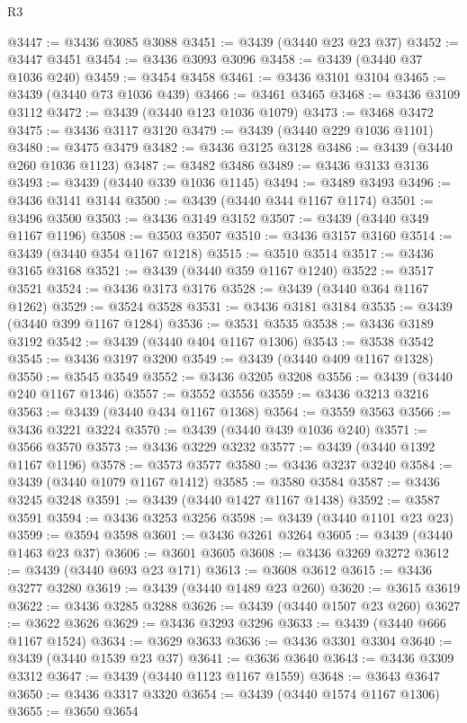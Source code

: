 \begin{lexlean}{R3}
\begin{coremodule}
@3447 := @3436 @3085 @3088
@3451 := @3439 (@3440 @23 @23 @37)
@3452 := @3447 @3451
@3454 := @3436 @3093 @3096
@3458 := @3439 (@3440 @37 @1036 @240)
@3459 := @3454 @3458
@3461 := @3436 @3101 @3104
@3465 := @3439 (@3440 @73 @1036 @439)
@3466 := @3461 @3465
@3468 := @3436 @3109 @3112
@3472 := @3439 (@3440 @123 @1036 @1079)
@3473 := @3468 @3472
@3475 := @3436 @3117 @3120
@3479 := @3439 (@3440 @229 @1036 @1101)
@3480 := @3475 @3479
@3482 := @3436 @3125 @3128
@3486 := @3439 (@3440 @260 @1036 @1123)
@3487 := @3482 @3486
@3489 := @3436 @3133 @3136
@3493 := @3439 (@3440 @339 @1036 @1145)
@3494 := @3489 @3493
@3496 := @3436 @3141 @3144
@3500 := @3439 (@3440 @344 @1167 @1174)
@3501 := @3496 @3500
@3503 := @3436 @3149 @3152
@3507 := @3439 (@3440 @349 @1167 @1196)
@3508 := @3503 @3507
@3510 := @3436 @3157 @3160
@3514 := @3439 (@3440 @354 @1167 @1218)
@3515 := @3510 @3514
@3517 := @3436 @3165 @3168
@3521 := @3439 (@3440 @359 @1167 @1240)
@3522 := @3517 @3521
@3524 := @3436 @3173 @3176
@3528 := @3439 (@3440 @364 @1167 @1262)
@3529 := @3524 @3528
@3531 := @3436 @3181 @3184
@3535 := @3439 (@3440 @399 @1167 @1284)
@3536 := @3531 @3535
@3538 := @3436 @3189 @3192
@3542 := @3439 (@3440 @404 @1167 @1306)
@3543 := @3538 @3542
@3545 := @3436 @3197 @3200
@3549 := @3439 (@3440 @409 @1167 @1328)
@3550 := @3545 @3549
@3552 := @3436 @3205 @3208
@3556 := @3439 (@3440 @240 @1167 @1346)
@3557 := @3552 @3556
@3559 := @3436 @3213 @3216
@3563 := @3439 (@3440 @434 @1167 @1368)
@3564 := @3559 @3563
@3566 := @3436 @3221 @3224
@3570 := @3439 (@3440 @439 @1036 @240)
@3571 := @3566 @3570
@3573 := @3436 @3229 @3232
@3577 := @3439 (@3440 @1392 @1167 @1196)
@3578 := @3573 @3577
@3580 := @3436 @3237 @3240
@3584 := @3439 (@3440 @1079 @1167 @1412)
@3585 := @3580 @3584
@3587 := @3436 @3245 @3248
@3591 := @3439 (@3440 @1427 @1167 @1438)
@3592 := @3587 @3591
@3594 := @3436 @3253 @3256
@3598 := @3439 (@3440 @1101 @23 @23)
@3599 := @3594 @3598
@3601 := @3436 @3261 @3264
@3605 := @3439 (@3440 @1463 @23 @37)
@3606 := @3601 @3605
@3608 := @3436 @3269 @3272
@3612 := @3439 (@3440 @693 @23 @171)
@3613 := @3608 @3612
@3615 := @3436 @3277 @3280
@3619 := @3439 (@3440 @1489 @23 @260)
@3620 := @3615 @3619
@3622 := @3436 @3285 @3288
@3626 := @3439 (@3440 @1507 @23 @260)
@3627 := @3622 @3626
@3629 := @3436 @3293 @3296
@3633 := @3439 (@3440 @666 @1167 @1524)
@3634 := @3629 @3633
@3636 := @3436 @3301 @3304
@3640 := @3439 (@3440 @1539 @23 @37)
@3641 := @3636 @3640
@3643 := @3436 @3309 @3312
@3647 := @3439 (@3440 @1123 @1167 @1559)
@3648 := @3643 @3647
@3650 := @3436 @3317 @3320
@3654 := @3439 (@3440 @1574 @1167 @1306)
@3655 := @3650 @3654

\end{coremodule}
\end{lexlean}

